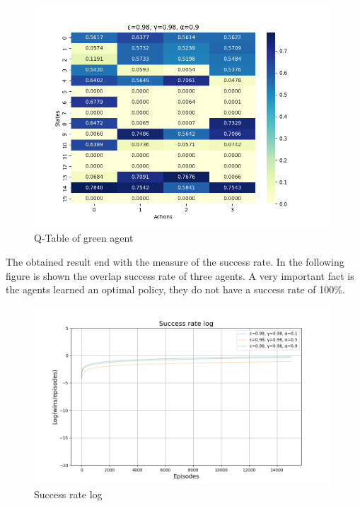 \begin{figure}[H]
    \centering
    \includegraphics[width=0.99\textwidth]{images/heatmap_nd3.png}
    \caption{Q-Table of green agent}
    \label{fig:green_agent_nd}
\end{figure}
The obtained result end with the measure of the success rate.
In the following figure is shown the overlap success rate of three agents.
A very important fact is the agents learned an optimal policy, they do not have a success rate of 100\%.
\begin{figure}[H]
    \centering
    \includegraphics[width=0.99\textwidth]{images/success_rate_log_nd.png}
    \caption{Success rate log}
    \label{fig:success_rate_log_nd}
\end{figure}
